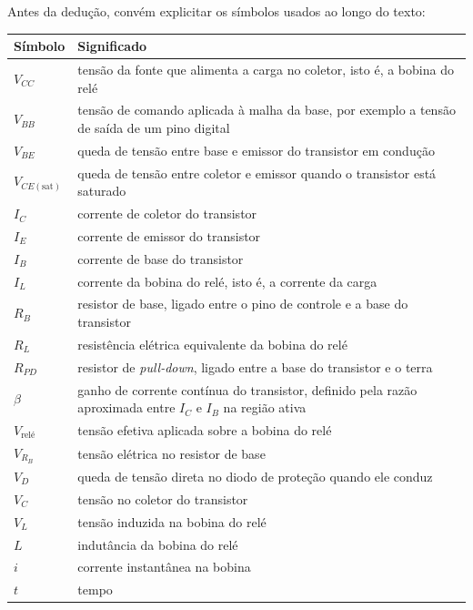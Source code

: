 \documentclass[12pt,a4paper]{article}
\newcommand{\Vcc}{V_{CC}}
\newcommand{\Vbb}{V_{BB}}
\newcommand{\Vbe}{V_{BE}}
\newcommand{\Vcesat}{V_{CE(\mathrm{sat})}}
\newcommand{\Ic}{I_C}
\newcommand{\Ie}{I_E}
\newcommand{\Ib}{I_B}
\newcommand{\Il}{I_L}
\newcommand{\Rb}{R_B}
\newcommand{\Rl}{R_L}
\newcommand{\Rpd}{R_{PD}}
\begin{document}
Antes da dedução, convém explicitar os símbolos usados ao longo do texto:

\begin{center}
\begin{tabular}{>{\centering\arraybackslash}p{2.5cm} p{10.0cm}}
\toprule
Símbolo & Significado \\
\midrule
$\Vcc$ & tensão da fonte que alimenta a carga no coletor, isto é, a bobina do relé \\
$\Vbb$ & tensão de comando aplicada à malha da base, por exemplo a tensão de saída de um pino digital \\
$\Vbe$ & queda de tensão entre base e emissor do transistor em condução \\
$\Vcesat$ & queda de tensão entre coletor e emissor quando o transistor está saturado \\
$\Ic$ & corrente de coletor do transistor \\
$\Ie$ & corrente de emissor do transistor \\
$\Ib$ & corrente de base do transistor \\
$\Il$ & corrente da bobina do relé, isto é, a corrente da carga \\
$\Rb$ & resistor de base, ligado entre o pino de controle e a base do transistor \\
$\Rl$ & resistência elétrica equivalente da bobina do relé \\
$\Rpd$ & resistor de \emph{pull-down}, ligado entre a base do transistor e o terra \\
$\beta$ & ganho de corrente contínua do transistor, definido pela razão aproximada entre $\Ic$ e $\Ib$ na região ativa \\
$V_{\text{relé}}$ & tensão efetiva aplicada sobre a bobina do relé \\
$V_{\Rb}$ & tensão elétrica no resistor de base \\
$V_D$ & queda de tensão direta no diodo de proteção quando ele conduz \\
$V_C$ & tensão no coletor do transistor \\
$V_L$ & tensão induzida na bobina do relé \\
$L$ & indutância da bobina do relé \\
$i$ & corrente instantânea na bobina \\
$t$ & tempo \\
\bottomrule
\end{tabular}
\end{center}
\end{document}
